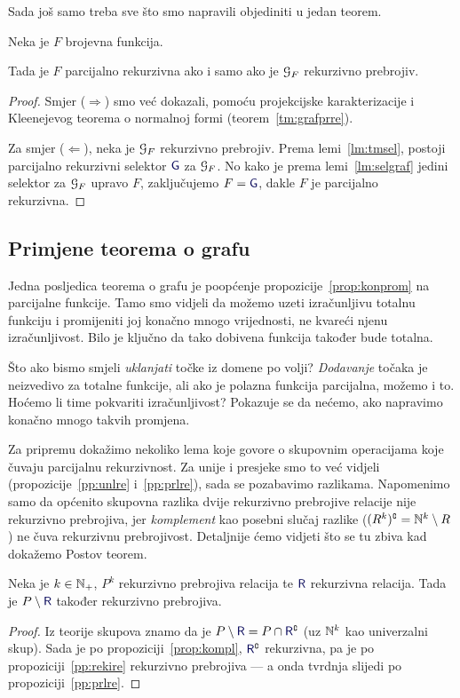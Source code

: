 Sada još samo treba sve što smo napravili objediniti u jedan teorem.

\begin{teorem}\label{tm:graf}
Neka je $F$ brojevna funkcija.

Tada je $F$ parcijalno rekurzivna ako i samo ako je $\mathcal G_{F}$ rekurzivno prebrojiv.
\end{teorem}
\begin{proof}
Smjer ($\Rightarrow$) smo već dokazali, pomoću projekcijske karakterizacije i Kleenejevog teorema o normalnoj formi (teorem~\ref{tm:grafprre}).

Za smjer ($\Leftarrow$), neka je $\mathcal G_{F}$ rekurzivno prebrojiv. Prema lemi~\ref{lm:tmsel}, postoji parcijalno rekurzivni selektor $\f G$ za $\mathcal G_{F}$. No kako je prema lemi~\ref{lm:selgraf} jedini selektor za $\mathcal G_{F}$ upravo $F$, zaključujemo $F=\f G$, dakle $F$ je parcijalno rekurzivna.
\end{proof}

\subsection{Primjene teorema o grafu}

Jedna posljedica teorema o grafu je poopćenje propozicije~\ref{prop:konprom} na parcijalne funkcije. Tamo smo vidjeli da možemo uzeti izračunljivu totalnu funkciju i promijeniti joj konačno mnogo vrijednosti, ne kvareći njenu izračunljivost. Bilo je ključno da tako dobivena funkcija također bude totalna.

Što ako bismo smjeli \emph{uklanjati} točke iz domene po volji? \emph{Dodavanje} točaka je neizvedivo za totalne funkcije, ali ako je polazna funkcija parcijalna, možemo i to. Hoćemo li time pokvariti izračunljivost? Pokazuje se da nećemo, ako napravimo konačno mnogo takvih promjena.

Za pripremu dokažimo nekoliko lema koje govore o skupovnim operacijama koje čuvaju parcijalnu rekurzivnost. Za unije i presjeke smo to već vidjeli (propozicije~\ref{pp:unlre} i~\ref{pp:prlre}), sada se pozabavimo razlikama. Napomenimo samo da općenito skupovna razlika dvije rekurzivno prebrojive relacije nije rekurzivno prebrojiva, jer \emph{komplement} kao posebni slučaj razlike ($(R^k)\sp{{\scriptscriptstyle\complement}}={\mathbb N}^k\setminus R\mspace{2mu}$) ne čuva rekurzivnu prebrojivost. Detaljnije ćemo vidjeti što se tu zbiva kad dokažemo Postov teorem.

\begin{lema}[{name=[rekurzivna prebrojivost razlike s rekurzivnom relacijom]}]\label{lm:re-rek}
Neka je $k\in{\mathbb N}_+$, $P^k$ rekurzivno prebrojiva relacija te $\f R$ rekurzivna relacija. Tada je $P\setminus\f R$ također rekurzivno prebrojiva.
\end{lema}
\begin{proof}
    Iz teorije skupova znamo da je $P\setminus\f R=P\cap\f R\kompl$ (uz ${\mathbb N}^k$ kao univerzalni skup). Sada je po propoziciji~\ref{prop:kompl}, $\f R\kompl$ rekurzivna, pa je po propoziciji~\ref{pp:rekire} rekurzivno prebrojiva --- a onda tvrdnja slijedi po propoziciji~\ref{pp:prlre}.
\end{proof}

